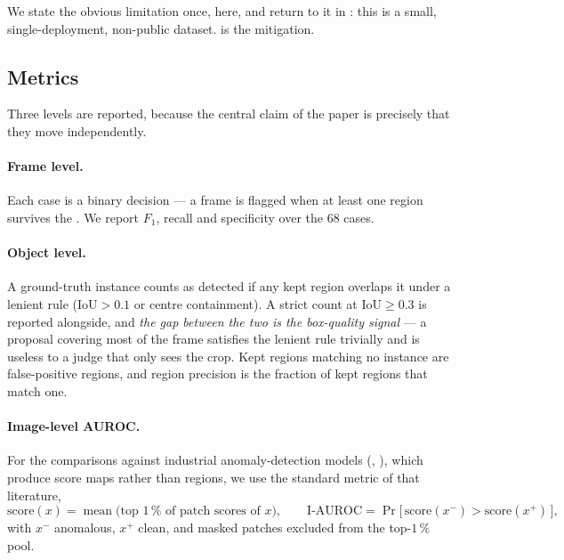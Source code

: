 We state the obvious limitation once, here, and return to it in
: this is a small, single-deployment, non-public
dataset.  is the mitigation.

\subsection{Metrics}
\label{sec:setup:metrics}

Three levels are reported, because the central claim of the paper is precisely
that they move independently.

\paragraph{Frame level.} Each case is a binary decision --- a frame is flagged
when at least one region survives the \judge{}. We report $F_1$, recall and
specificity over the 68 cases.

\paragraph{Object level.} A ground-truth instance counts as detected if any
kept region overlaps it under a lenient rule ($\mathrm{IoU} > 0.1$ or centre
containment). A strict count at $\mathrm{IoU} \ge 0.3$ is reported alongside,
and \emph{the gap between the two is the box-quality signal} --- a proposal
covering most of the frame satisfies the lenient rule trivially and is useless
to a judge that only sees the crop. Kept regions matching no instance are
false-positive regions, and region precision is the fraction of kept regions
that match one.

\paragraph{Image-level AUROC.} For the comparisons against industrial
anomaly-detection models (,
), which produce score maps rather than regions,
we use the standard metric of that literature,
%
\begin{equation}
  \mathrm{score}(x) = \operatorname{mean}\bigl( \text{top } 1\,\% \text{ of patch scores of } x \bigr),
  \qquad
  \text{I-AUROC} = \Pr\bigl[\, \mathrm{score}(x^{-}) > \mathrm{score}(x^{+}) \,\bigr],
  \label{eq:iauroc}
\end{equation}
%
with $x^{-}$ anomalous, $x^{+}$ clean, and masked patches excluded from the
top-$1\,\%$ pool.


